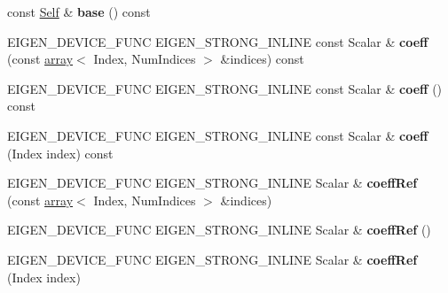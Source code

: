 \begin{DoxyCompactItemize}
\item 
\mbox{\label{class_eigen_1_1_tensor_a517c7806e6e10d3a7adba81ee4dda3c8}} 
const \hyperlink{class_eigen_1_1_tensor}{Self} \& {\bfseries base} () const
\item 
\mbox{\label{class_eigen_1_1_tensor_a7dfc391a1418c82a8ca7d73da9908ffb}} 
E\+I\+G\+E\+N\+\_\+\+D\+E\+V\+I\+C\+E\+\_\+\+F\+U\+NC E\+I\+G\+E\+N\+\_\+\+S\+T\+R\+O\+N\+G\+\_\+\+I\+N\+L\+I\+NE const Scalar \& {\bfseries coeff} (const \hyperlink{class_eigen_1_1array}{array}$<$ Index, Num\+Indices $>$ \&indices) const
\item 
\mbox{\label{class_eigen_1_1_tensor_ae81c979a82b4c82f31c5212056a2df97}} 
E\+I\+G\+E\+N\+\_\+\+D\+E\+V\+I\+C\+E\+\_\+\+F\+U\+NC E\+I\+G\+E\+N\+\_\+\+S\+T\+R\+O\+N\+G\+\_\+\+I\+N\+L\+I\+NE const Scalar \& {\bfseries coeff} () const
\item 
\mbox{\label{class_eigen_1_1_tensor_a147f4271e2dd043eb6692a17f6dd1590}} 
E\+I\+G\+E\+N\+\_\+\+D\+E\+V\+I\+C\+E\+\_\+\+F\+U\+NC E\+I\+G\+E\+N\+\_\+\+S\+T\+R\+O\+N\+G\+\_\+\+I\+N\+L\+I\+NE const Scalar \& {\bfseries coeff} (Index index) const
\item 
\mbox{\label{class_eigen_1_1_tensor_a5cffcaf8927b06f8e0d1c84eda3c53da}} 
E\+I\+G\+E\+N\+\_\+\+D\+E\+V\+I\+C\+E\+\_\+\+F\+U\+NC E\+I\+G\+E\+N\+\_\+\+S\+T\+R\+O\+N\+G\+\_\+\+I\+N\+L\+I\+NE Scalar \& {\bfseries coeff\+Ref} (const \hyperlink{class_eigen_1_1array}{array}$<$ Index, Num\+Indices $>$ \&indices)
\item 
\mbox{\label{class_eigen_1_1_tensor_ade3fea6870c753611d94ad7cda134d08}} 
E\+I\+G\+E\+N\+\_\+\+D\+E\+V\+I\+C\+E\+\_\+\+F\+U\+NC E\+I\+G\+E\+N\+\_\+\+S\+T\+R\+O\+N\+G\+\_\+\+I\+N\+L\+I\+NE Scalar \& {\bfseries coeff\+Ref} ()
\item 
\mbox{\label{class_eigen_1_1_tensor_a66dd2792186fd155fdd43879e7d08c0b}} 
E\+I\+G\+E\+N\+\_\+\+D\+E\+V\+I\+C\+E\+\_\+\+F\+U\+NC E\+I\+G\+E\+N\+\_\+\+S\+T\+R\+O\+N\+G\+\_\+\+I\+N\+L\+I\+NE Scalar \& {\bfseries coeff\+Ref} (Index index)
\item 
\mbox{\label{class_eigen_1_1_tensor_a5e8e608cfaa7d621f603cb7ace9d8df0}} 

\end{DoxyCompactItemize}
